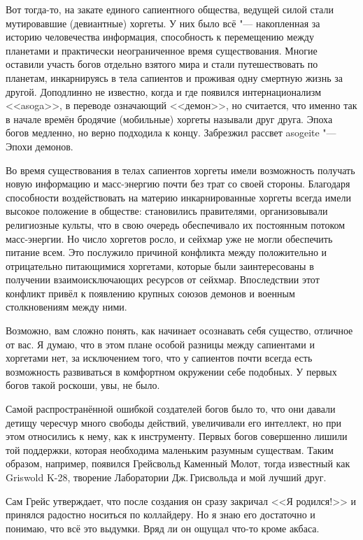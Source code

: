 Вот тогда-то, на закате единого сапиентного общества, ведущей силой стали мутировавшие (девиантные) хоргеты.
У них было всё "--- накопленная за историю человечества информация, способность к перемещению между планетами и практически неограниченное время существования.
Многие оставили участь богов отдельно взятого мира и стали путешествовать по планетам, инкарнируясь в тела сапиентов и проживая одну смертную жизнь за другой.
Доподлинно не известно, когда и где появился интернационализм <<asoga>>, в переводе означающий <<демон>>, но считается, что именно так в начале времён бродячие (мобильные) хоргеты называли друг друга.
Эпоха богов медленно, но верно подходила к концу.
Забрезжил рассвет asogeite "--- Эпохи демонов.

Во время существования в телах сапиентов хоргеты имели возможность получать новую информацию и масс-энергию почти без трат со своей стороны.
Благодаря способности воздействовать на материю инкарнированные хоргеты всегда имели высокое положение в обществе: становились правителями, организовывали религиозные культы, что в свою очередь обеспечивало их постоянным потоком масс-энергии.
Но число хоргетов росло, и сейхмар уже не могли обеспечить питание всем.
Это послужило причиной конфликта между положительно и отрицательно питающимися хоргетами, которые были заинтересованы в получении взаимоисключающих ресурсов от сейхмар.
Впоследствии этот конфликт привёл к появлению крупных союзов демонов и военным столкновениям между ними.

\spacing

Возможно, вам сложно понять, как начинает осознавать себя существо, отличное от вас.
Я думаю, что в этом плане особой разницы между сапиентами и хоргетами нет, за исключением того, что у сапиентов почти всегда есть возможность развиваться в комфортном окружении себе подобных.
У первых богов такой роскоши, увы, не было.

Самой распространённой ошибкой создателей богов было то, что они давали детищу чересчур много свободы действий, увеличивали его интеллект, но при этом относились к нему, как к инструменту.
Первых богов совершенно лишили той поддержки, которая необходима маленьким разумным существам.
Таким образом, например, появился Грейсвольд Каменный Молот, тогда известный как Griswold K-28, творение Лаборатории Дж.\,Грисвольда и мой лучший друг.

Сам Грейс утверждает, что после создания он сразу закричал <<Я родился!>> и принялся радостно носиться по коллайдеру.
Но я знаю его достаточно и понимаю, что всё это выдумки.
Вряд ли он ощущал что-то кроме акбаса.

